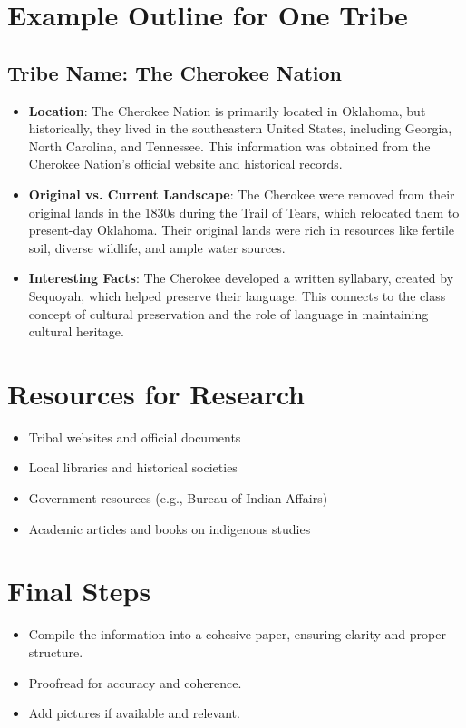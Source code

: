 \documentclass{article}
\begin{document}
\section{Example Outline for One Tribe}

\subsection{Tribe Name: The Cherokee Nation}
\begin{itemize}
    \item \textbf{Location}: The Cherokee Nation is primarily located in Oklahoma, but historically, they lived in the southeastern United States, including Georgia, North Carolina, and Tennessee. This information was obtained from the Cherokee Nation's official website and historical records.
    \item \textbf{Original vs. Current Landscape}: The Cherokee were removed from their original lands in the 1830s during the Trail of Tears, which relocated them to present-day Oklahoma. Their original lands were rich in resources like fertile soil, diverse wildlife, and ample water sources.
    \item \textbf{Interesting Facts}: The Cherokee developed a written syllabary, created by Sequoyah, which helped preserve their language. This connects to the class concept of cultural preservation and the role of language in maintaining cultural heritage.
\end{itemize}

\section{Resources for Research}
\begin{itemize}
    \item Tribal websites and official documents
    \item Local libraries and historical societies
    \item Government resources (e.g., Bureau of Indian Affairs)
    \item Academic articles and books on indigenous studies
\end{itemize}

\section{Final Steps}
\begin{itemize}
    \item Compile the information into a cohesive paper, ensuring clarity and proper structure.
    \item Proofread for accuracy and coherence.
    \item Add pictures if available and relevant.
\end{itemize}
\end{document}
